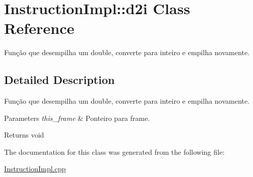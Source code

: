 \hypertarget{class_instruction_impl_1_1d2i}{}\section{Instruction\+Impl\+:\+:d2i Class Reference}
\label{class_instruction_impl_1_1d2i}


Função que desempilha um double, converte para inteiro e empilha novamente.  




\subsection{Detailed Description}
Função que desempilha um double, converte para inteiro e empilha novamente. 


\begin{DoxyParams}{Parameters}
{\em this\+\_\+frame} & Ponteiro para frame. \\
\hline
\end{DoxyParams}
\begin{DoxyReturn}{Returns}
void 
\end{DoxyReturn}


The documentation for this class was generated from the following file\+:\begin{DoxyCompactItemize}
\item 
\hyperlink{_instruction_impl_8cpp}{Instruction\+Impl.\+cpp}\end{DoxyCompactItemize}
